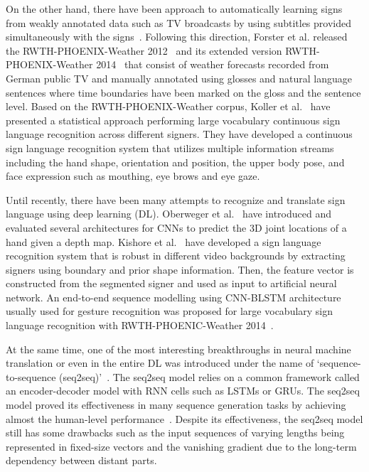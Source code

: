 \documentclass[10pt,twocolumn,letterpaper]{article}
\begin{document}
On the other hand, there have been approach to automatically learning signs from weakly annotated data such as TV broadcasts by using subtitles provided simultaneously with the signs~\cite{BuehlerZE09,CooperB09,PfisterCZ13}. Following this direction, Forster et al. released the RWTH-PHOENIX-Weather 2012~\cite{ForsterSHKZPN12} and its extended version RWTH-PHOENIX-Weather 2014~\cite{ForsterSKBN14} that consist of weather forecasts recorded from German public TV and manually annotated using glosses and natural language sentences where time boundaries have been marked on the gloss and the sentence level. Based on the RWTH-PHOENIX-Weather corpus, Koller et al.~\cite{KollerFN15} have presented a statistical approach performing large vocabulary continuous sign language recognition across different signers. They have developed a continuous sign language recognition system that utilizes multiple information streams including the hand shape, orientation and position, the upper body pose, and face expression such as mouthing, eye brows and eye gaze.

Until recently, there have been many attempts to recognize and translate sign language using deep learning (DL). Oberweger et al.~\cite{OberwegerWL15} have introduced and evaluated several architectures for CNNs to predict the 3D joint locations of a hand given a depth map. Kishore et al.~\cite{KishoreSK14} have developed a sign language recognition system that is robust in different video backgrounds by extracting signers using boundary and prior shape information. Then, the feature vector is constructed from the segmented signer and used as input to artificial neural network. An end-to-end sequence modelling using CNN-BLSTM architecture usually used for gesture recognition was proposed for large vocabulary sign language recognition with RWTH-PHOENIC-Weather 2014~\cite{koller2017re}.

At the same time, one of the most interesting breakthroughs in neural machine translation or even in the entire DL was introduced under the name of `sequence-to-sequence (seq2seq)'~\cite{SutskeverVL14}. The seq2seq model relies on a common framework called an encoder-decoder model with RNN cells such as LSTMs or GRUs. The seq2seq model proved its effectiveness in many sequence generation tasks by achieving almost the human-level performance~\cite{SutskeverVL14}. Despite its effectiveness, the seq2seq model still has some drawbacks such as the input sequences of varying lengths being represented in fixed-size vectors and the vanishing gradient due to the long-term dependency between distant parts.
\end{document}

